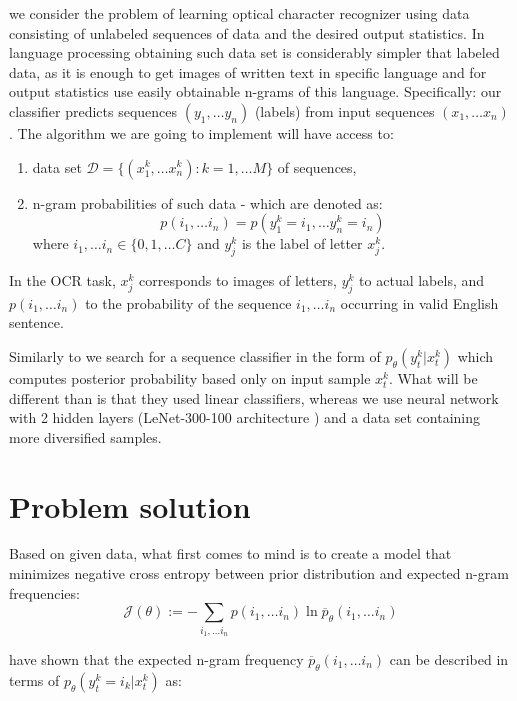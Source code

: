 \documentclass[declaration,shortabstract,lic,english]{iithesis}
\begin{document}
we consider the problem of learning optical character recognizer using data consisting of unlabeled sequences of data and the desired output statistics. In language processing obtaining such data set is considerably simpler that labeled data, as it is enough to get images of written text in specific language and for output statistics use easily obtainable n-grams of this language. Specifically: our classifier predicts sequences \( (y_1, \dots y_n) \) (labels) from input sequences \( (x_1, \dots x_n) \). The  algorithm we are going to implement will have access to:
\begin{enumerate}
    \item  data set \( \mathcal{D} = \lbrace (x_1^k, \dots x_n^k) : k = 1, \dots M \rbrace \) of sequences,
    \item n-gram probabilities of such data - which are denoted as: 
\[ p(i_1, \dots i_n) = p(y_1^k = i_1, \dots y_n^k = i_n) \]
where \( i_1, \dots i_n \in \lbrace 0, 1, \dots C \rbrace \) and \( y_j^k \) is the label of letter \( x_j^k \).
\end{enumerate}

In the OCR task, $x_j^k$ corresponds to images of letters, $y_j^k$ to actual labels, and $p(i_1, \dots i_n)$ to the probability of the sequence $i_1, \dots i_n$ occurring in valid English sentence.

Similarly to \citet{liu2017unsupervised} we search for a sequence classifier in the form of $p_\theta(y_t^k | x_t^k)$ which computes posterior probability based only on input sample $x_t^k$. What will be different than \citet{liu2017unsupervised} is that they used linear classifiers, whereas we use neural network with 2 hidden layers (\mbox{LeNet-300-100} architecture \citep{lecun1998gradient}) and a data set containing more diversified samples.

\chapter{Problem solution}


Based on given data, what first comes to mind is to create a model that minimizes negative cross entropy between prior distribution and expected n-gram frequencies:
\begin{equation} \label{cross-entropy}
    \mathcal{J}(\theta) := - \sum_{i_1, \dots i_n}p(i_1,\dots i_n) \ln \overline{p}_\theta(i_1, \dots i_n)
\end{equation}

\citet{liu2017unsupervised} have shown that the expected n-gram frequency $\overline{p}_\theta(i_1, \dots i_n)$ can be described in terms of $p_\theta(y_t^k = i_k | x_t^k)$ as:
\end{document}
